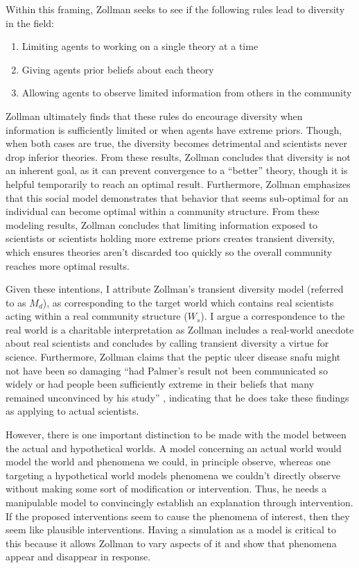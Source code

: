 Within this framing, Zollman seeks to see if the following rules lead to
diversity in the field:

\begin{enumerate}
\def\labelenumi{\arabic{enumi}.}
\tightlist
\item
  Limiting agents to working on a single theory at a time
\item
  Giving agents prior beliefs about each theory
\item
  Allowing agents to observe limited information from others in the
  community
\end{enumerate}

Zollman ultimately finds that these rules do encourage diversity when
information is sufficiently limited or when agents have extreme priors.
Though, when both cases are true, the diversity becomes detrimental and
scientists never drop inferior theories. From these results, Zollman
concludes that diversity is not an inherent goal, as it can prevent
convergence to a ``better'' theory, though it is helpful temporarily to
reach an optimal result. Furthermore, Zollman emphasizes that this
social model demonstrates that behavior that seems sub-optimal for an
individual can become optimal within a community structure. From these
modeling results, Zollman concludes that limiting information exposed to
scientists or scientists holding more extreme priors creates transient
diversity, which ensures theories aren't discarded too quickly so the
overall community reaches more optimal results.

Given these intentions, I attribute Zollman's transient diversity model
(referred to as \(M_d\)), as corresponding to the target world which
contains real scientists acting within a real community structure
(\(W_s\)). I argue a correspondence to the real world is a charitable
interpretation as Zollman includes a real-world anecdote about real
scientists and concludes by calling transient diversity a virtue for
science. Furthermore, Zollman claims that the peptic ulcer disease snafu
might not have been so damaging ``had Palmer's result not been
communicated so widely or had people been sufficiently extreme in their
beliefs that many remained unconvinced by his study''
\autocite[p.~33][]{zollmanEpistemicBenefitTransient2009}, indicating
that he does take these findings as applying to actual scientists.

However, there is one important distinction to be made with the model
between the actual and hypothetical worlds. A model concerning an actual
world would model the world and phenomena we could, in principle
observe, whereas one targeting a hypothetical world models phenomena we
couldn't directly observe without making some sort of modification or
intervention. Thus, he needs a manipulable model to convincingly
establish an explanation through intervention. If the proposed
interventions seem to cause the phenomena of interest, then they seem
like plausible interventions. Having a simulation as a model is critical
to this because it allows Zollman to vary aspects of it and show that
phenomena appear and disappear in response.

